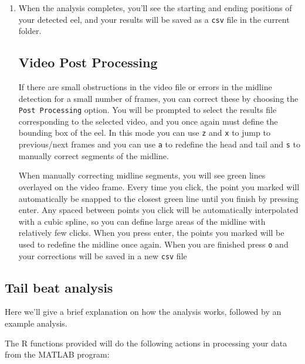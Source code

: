 \documentclass[11pt]{report}
\begin{document}
\begin{enumerate}
	\item When the analysis completes, you'll see the starting and ending positions of your detected eel, and your results will be saved as a \texttt{csv} file in the current folder.


	      \subsection{Video Post Processing}
	      If there are small obstructions in the video file or errors in the midline detection for a small number of frames, you can correct these by choosing the \texttt{Post Processing} option.
	      You will be prompted to select the results file corresponding to the selected video, and you once again must define the bounding box of the eel.
	      In this mode you can use \texttt{z} and \texttt{x} to jump to previous/next frames and you can use \texttt{a} to redefine the head and tail and \texttt{s} to manually correct segments of the midline.

	      When manually correcting midline segments, you will see green lines overlayed on the video frame.
	      Every time you click, the point you marked will automatically be snapped to the closest green line until you finish by pressing enter.
	      Any spaced between points you click will be automatically interpolated with a cubic spline, so you can define large areas of the midline with relatively few clicks.
	      When you press enter, the points you marked will be used to redefine the midline once again.
	      When you are finished press \texttt{o} and your corrections will be saved in a new \texttt{csv} file
\end{enumerate}

\subsection{Tail beat analysis}

Here we'll give a brief explanation on how the analysis works, followed by an example analysis.

The R functions provided will do the following actions in processing your data from the MATLAB program:
\end{document}
